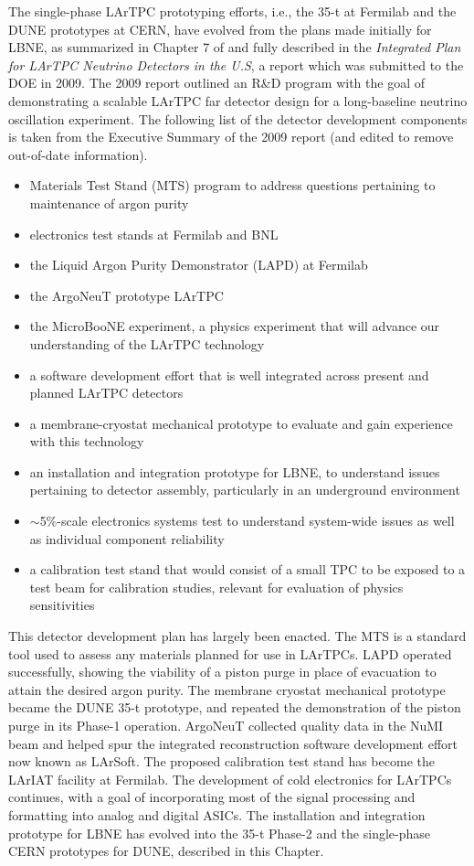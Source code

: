 The single-phase LArTPC prototyping efforts, i.e., the 35-t at
Fermilab and the DUNE prototypes at CERN, have evolved from the plans
made initially for LBNE, as summarized in Chapter 7 of \anxlbnefd{}
and fully described in the \textit{Integrated Plan for LArTPC Neutrino
  Detectors in the U.S}, a report which was submitted to the DOE in
2009.  The 2009 report outlined an R\&D program with the goal of
demonstrating a scalable LArTPC far detector design for a
long-baseline neutrino oscillation experiment.  The following list of
the detector development components is taken from the Executive
Summary of the 2009 report (and edited to remove out-of-date
information).
\begin{itemize}
   \item Materials Test Stand (MTS) program 
   to address questions pertaining to maintenance of argon purity
    \item electronics test stands at Fermilab and BNL
    \item the Liquid Argon Purity Demonstrator (LAPD) at Fermilab
    \item the ArgoNeuT prototype LArTPC 
    \item the MicroBooNE experiment, a physics experiment that will advance our understanding of the LArTPC technology 
    \item a software development effort that is well integrated across present and planned LArTPC detectors
    \item a membrane-cryostat mechanical prototype to evaluate and gain experience with this technology
    \item an installation and integration prototype for LBNE, to understand issues pertaining to detector assembly, particularly in an underground environment
    \item  $\sim$5\%-scale electronics systems test to understand system-wide issues as well as individual component reliability
    \item a calibration test stand that would consist of a small TPC to be exposed to a test beam for calibration studies, relevant for evaluation of physics sensitivities   
\end{itemize}

This detector development plan has largely been enacted.  The MTS is a
standard tool used to assess any materials planned for use in LArTPCs.
LAPD operated successfully, showing the viability of a piston purge in
place of evacuation to attain the desired argon purity.  The membrane
cryostat mechanical prototype became the DUNE 35-t prototype, and
repeated the demonstration of the piston purge in its Phase-1
operation.  ArgoNeuT collected quality data in the NuMI beam and
helped spur the integrated reconstruction software development effort
now known as LArSoft.  The proposed calibration test stand has become
the LArIAT facility at Fermilab.  The development of cold electronics
for LArTPCs continues, with a goal of incorporating most of the signal
processing and formatting into analog and digital ASICs.  The
installation and integration prototype for LBNE has evolved into the
35-t Phase-2 and the single-phase CERN prototypes for DUNE, described
in this Chapter.
 
